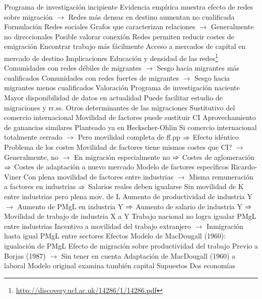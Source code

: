 \documentclass{nuevotema}
\begin{document}
\begin{esquemal}
				\4[] Programa de investigación incipiente
				\4[] Evidencia empírica muestra efecto de redes sobre migración
				\4[] $\to$ Redes más densas en destino aumentan no cualificada
			\3 Formulación
				\4 Redes sociales
				\4[] Grafos que caracterizan relaciones
				\4[] $\to$ Generalmente no direccionales
				\4[] Posible valorar conexión
				\4 Redes permiten reducir costes de emigración
				\4[] Encontrar trabajo más fácilmente
				\4[] Acceso a mercados de capital en mercado de destino
			\3 Implicaciones
				\4 Educación y densidad de las redes\footnote{\url{http://discovery.ucl.ac.uk/14286/1/14286.pdf}}
				\4[] Comunidades con redes débiles de migrantes
				\4[] $\to$ Sesgo hacia migrantes más cualificados
				\4[] Comunidades con redes fuertes de migrantes
				\4[] $\to$ Sesgo hacia migrantes menos cualificados
			\3 Valoración
				\4 Programa de investigación naciente
				\4 Mayor disponibilidad de datos en actualidad
				\4[] Puede facilitar estudio de migraciones y rr.ss.
		\2 Otros determinantes de las migraciones
			\3 Sustitutivo del comercio internacional
				\4 Movilidad de factores puede sustituir CI
				\4[] Aprovechamiento de ganancias similares
				\4 Planteado ya en Heckscher-Ohlin
				\4[] Si comercio internacional totalmente cerrado
				\4[] $\to$ Pero movilidad completa de ff.pp
				\4[] $\Rightarrow$ Efecto idéntico
				\4 Problema de los costes
				\4[] Movilidad de factores tiene mismos costes que CI?
				\4[] $\to$ Generalmente, no
				\4[] $\to$ En migración especialmente no
				\4[] $\Rightarrow$ Costes de aglomeración
				\4[] $\Rightarrow$ Costes de adaptación a nuevo mercado
			\3 Modelo de factores específicos Ricardo-Viner
				\4 Con plena movilidad de factores entre industrias
				\4[] $\to$ Misma remuneración a factores en industrias
				\4[] $\Rightarrow$ Salarios reales deben igualarse
				\4 Sin movilidad de K entre industrias pero plena mov. de L
				\4[] Aumento de productividad de industria Y
				\4[] $\to$ Aumento de PMgL en industria Y
				\4[] $\Rightarrow$ Aumento de salario de industria Y
				\4[] $\Rightarrow$ Movilidad de trabajo de industria X a Y
				\4 Trabajo nacional no logra igualar PMgL entre industrias
				\4[] Incentivo a movilidad del trabajo extranjero
				\4[] $\to$ Inmigración hasta igual PMgL entre sectores
		\2 Efectos
			\3 Modelo de MacDougall (1960): igualación de PMgL
				\4 Efecto de migración sobre productividad del trabajo
				\4[] Previo a Borjas (1987)
				\4[] $\to$ Sin tener en cuenta
				\4 Adaptación de MacDougall (1960) a laboral
				\4[] Modelo original examina también capital
				\4 Supuestos
				\4[] Dos economías

\end{esquemal}
\end{document}
